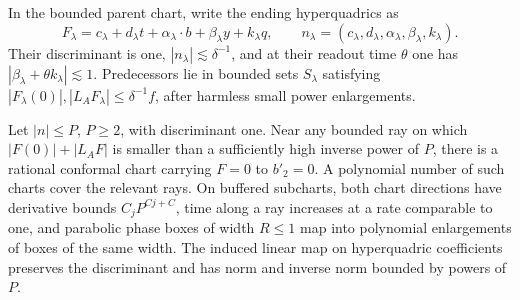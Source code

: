 In the bounded parent chart, write the ending hyperquadrics as
\[
 F_\lambda=c_\lambda+d_\lambda t+
 \alpha_\lambda\cdot b+\beta_\lambda y+k_\lambda q,
 \qquad n_\lambda=(c_\lambda,d_\lambda,\alpha_\lambda,
                   \beta_\lambda,k_\lambda).
\]
Their discriminant is one, $|n_\lambda|\lesssim\delta^{-1}$, and at their
readout time $\theta$ one has $|\beta_\lambda+\theta k_\lambda|\lesssim1$.
Predecessors lie in bounded sets $S_\lambda$ satisfying
$|F_\lambda(0)|,|L_AF_\lambda|\le\delta^{-1}f$, after harmless small
power enlargements.

\begin{lemma}\label{rt:conformal-chart}
Let $|n|\le P$, $P\ge2$, with discriminant one.  Near any bounded ray
on which $|F(0)|+|L_AF|$ is smaller than a sufficiently high inverse
power of $P$, there is a rational conformal chart carrying $F=0$ to
$b'_2=0$.  A polynomial number of such charts cover the relevant rays.
On buffered subcharts, both chart directions have derivative bounds
$C_jP^{Cj+C}$, time along a ray increases at a rate comparable to one,
and parabolic phase boxes of width $R\le1$ map into polynomial
enlargements of boxes of the same width.
The induced linear map on hyperquadric coefficients preserves the
discriminant and has norm and inverse norm bounded by powers of $P$.
\end{lemma}

